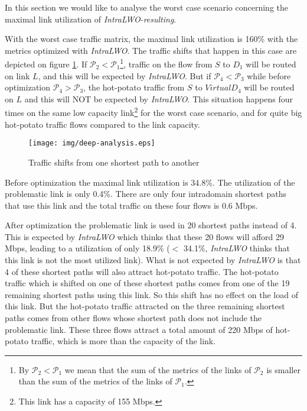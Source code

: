 \documentclass{acm_proc_article-sp}
\begin{document}
In this section we would like to analyse the worst case scenario
concerning the maximal link utilization of \textit{IntraLWO-resulting}. 

With the worst case traffic matrix, the maximal link utilization is
160\% with the metrics optimized with \textit{IntraLWO}.
The traffic shifts that happen in this case are depicted on figure
\ref{fig:deep-analysis}. If $\mathcal{P}_2 <
\mathcal{P}_1$\footnote{By $\mathcal{P}_2 < \mathcal{P}_1$ we mean
  that the sum of the metrics of the links of $\mathcal{P}_2$ is
  smaller than the sum of the metrics of the links of
  $\mathcal{P}_1$.}, traffic on the flow from $S$ to $D_1$ will be
routed on link $L$, and this will be expected by \textit{IntraLWO}. But if
$\mathcal{P}_4 < \mathcal{P}_3$ while before optimization
$\mathcal{P}_4 > \mathcal{P}_3$, the hot-potato traffic from $S$ to
$VirtualD_4$ will be routed on $L$ and this will NOT be expected by
\textit{IntraLWO}. This situation happens four times on the same low capacity
link\footnote{This link has a capacity of 155 Mbps.} for the
worst case scenario, and for quite big hot-potato traffic
flows compared to the link capacity. 

\begin{figure}[htbp]
  \centering
  \texttt{[image: img/deep-analysis.eps]}
  \caption{Traffic shifts from one shortest path to another}
  \label{fig:deep-analysis}
\end{figure}

Before optimization the maximal link utilization is 34.8\%. The
utilization of the problematic link is only 0.4\%. There are only four
intradomain shortest paths that use this link and the total traffic
on these four flows is 0.6 Mbps.

After optimization the problematic link is used in 20
shortest paths instead of 4. This is expected by \textit{IntraLWO} which thinks
that these 20 flows will afford 29 Mbps, leading to a utilization
of only 18.9\% ($<$ 34.1\%, \textit{IntraLWO} thinks that this link is
not the most utilized link). What is not expected by \textit{IntraLWO} is that 4 of these
shortest paths will also attract hot-potato traffic. The hot-potato
traffic which is shifted on one of these shortest paths comes from one
of the 19 remaining shortest paths using this link. So this shift has
no effect on the load of this link. But the hot-potato traffic
attracted on the three remaining shortest paths comes from other flows
whose shortest path does not include the problematic link. These
three flows attract a total amount of 220 Mbps of hot-potato
traffic, which is more than the capacity of the link.
\end{document}
